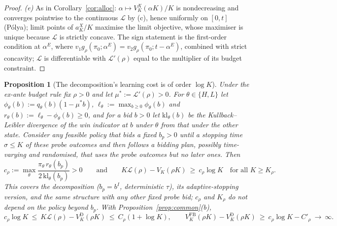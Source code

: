 \documentclass[11pt]{article}
\newtheorem{proposition}{Proposition}
\theoremstyle{definition}
\theoremstyle{remark}
\begin{document}
\begin{proof}
\emph{(e)} As in Corollary~\ref{cor:alloc}: $\alpha\mapsto V^X_K(\alpha K)/K$ is nondecreasing and converges pointwise to the
continuous $\mathcal L$ by (c), hence uniformly on $[0,t]$ (P\'olya); limit points of $a^X_K/K$ maximise the limit
objective, whose maximiser is unique because $\mathcal L$ is strictly concave. The sign statement is the first-order
condition at $\alpha^E$, where $v_1g_\rho(\pi_0;\alpha^E)=v_2g_\rho(\pi_0;t-\alpha^E)$, combined with strict concavity;
$\mathcal L$ is differentiable with $\mathcal L'(\rho)$ equal to the multiplier of its budget constraint.
\end{proof}

\begin{proposition}[The decomposition's learning cost is of order $\log K$]\label{prop:lower}
Under the ex-ante budget rule fix $\rho>0$ and let $\mu^*:=\mathcal L'(\rho)>0$. For $\theta\in\{H,L\}$ let
$\phi_\theta(b):=q_\theta(b)(1-\mu^*b)$, $\ell_\theta:=\max_{b\ge0}\phi_\theta(b)$ and $r_\theta(b):=\ell_\theta-\phi_\theta(b)\ge0$, and for a
bid $b>0$ let $\mathrm{kl}_\theta(b)$ be the Kullback--Leibler divergence of the win indicator at $b$ under $\theta$ from
that under the other state. Consider any feasible policy that bids a fixed $b_p>0$ until a stopping time $\sigma\le K$
of these probe outcomes and then follows a bidding plan, possibly time-varying and randomised, that uses the probe
outcomes but no later ones. Then
\[
c_\rho:=\max_{\theta}\frac{\pi_\theta\,r_\theta(b_p)}{2\,\mathrm{kl}_\theta(b_p)}>0
\qquad\text{and}\qquad K\mathcal L(\rho)-V_K(\rho K)\ \ge\ c_\rho\log K\quad\text{for all }K\ge K_\rho .
\]
This covers the decomposition ($b_p=b^I$, deterministic $\tau$), its adaptive-stopping version, and the same structure
with any other fixed probe bid; $c_\rho$ and $K_\rho$ do not depend on the policy beyond $b_p$. With
Proposition~\ref{prop:common}(b),
\[
c_\rho\log K\ \le\ K\mathcal L(\rho)-V^{\mathrm D}_K(\rho K)\ \le\ C_\rho(1+\log K),\qquad
V^{\mathrm{FB}}_K(\rho K)-V^{\mathrm D}_K(\rho K)\ \ge\ c_\rho\log K-C'_\rho\ \to\ \infty .
\]
\end{proposition}
\end{document}
